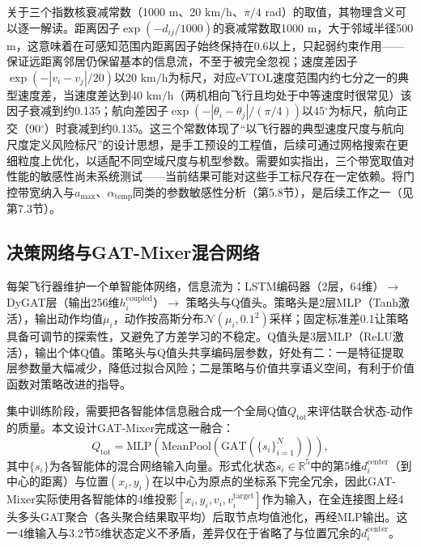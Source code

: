 \documentclass[12pt,a4paper,UTF8]{ctexart}
\begin{document}
关于三个指数核衰减常数（1000 m、20 $\mathrm{km/h}$、$\pi/4$ rad）的取值，其物理含义可以逐一解读。距离因子$\exp(-d_{ij}/1000)$的衰减常数取1000 m，大于邻域半径500 m，这意味着在可感知范围内距离因子始终保持在0.6以上，只起弱约束作用——保证远距离邻居仍保留基本的信息流，不至于被完全忽视；速度差因子$\exp(-|v_i-v_j|/20)$以20 $\mathrm{km/h}$为标尺，对应eVTOL速度范围内约七分之一的典型速度差，当速度差达到40 $\mathrm{km/h}$（两机相向飞行且均处于中等速度时很常见）该因子衰减到约0.135；航向差因子$\exp(-|\theta_i-\theta_j|/(\pi/4))$以45$^{\circ}$为标尺，航向正交（90$^{\circ}$）时衰减到约0.135。这三个常数体现了“以飞行器的典型速度尺度与航向尺度定义风险标尺”的设计思想，是手工预设的工程值，后续可通过网格搜索在更细粒度上优化，以适配不同空域尺度与机型参数。需要如实指出，三个带宽取值对性能的敏感性尚未系统测试——当前结果可能对这些手工标尺存在一定依赖。将门控带宽纳入与$a_{\max}$、$\alpha_{\text{temp}}$同类的参数敏感性分析（第5.8节），是后续工作之一（见第7.3节）。

\subsection{决策网络与GAT-Mixer混合网络}

每架飞行器维护一个单智能体网络，信息流为：LSTM编码器（2层，64维）$\to$ DyGAT层（输出256维$h_i^{\text{coupled}}$）$\to$ 策略头与Q值头。策略头是2层MLP（Tanh激活），输出动作均值$\mu_i$，动作按高斯分布$\mathcal{N}(\mu_i, 0.1^{2})$采样；固定标准差0.1让策略具备可调节的探索性，又避免了方差学习的不稳定。Q值头是3层MLP（ReLU激活），输出个体Q值。策略头与Q值头共享编码层参数，好处有二：一是特征提取层参数量大幅减少，降低过拟合风险；二是策略与价值共享语义空间，有利于价值函数对策略改进的指导。

集中训练阶段，需要把各智能体信息融合成一个全局Q值$Q_{\text{tot}}$来评估联合状态-动作的质量。本文设计GAT-Mixer完成这一融合：
\begin{equation}
    Q_{\text{tot}} = \text{MLP}\!\left(\text{MeanPool}\!\left(\text{GAT}\left(\{s_i\}_{i=1}^{N}\right)\right)\right),
    \label{eq:gat_mixer}
\end{equation}
其中$\{s_i\}$为各智能体的混合网络输入向量。形式化状态$s_i\in\mathbb{R}^5$中的第5维$d_i^{\text{center}}$（到中心的距离）与位置$(x_i,y_i)$在以中心为原点的坐标系下完全冗余，因此GAT-Mixer实际使用各智能体的4维投影$[x_i,y_i,v_i,v_i^{\text{target}}]$作为输入，在全连接图上经4头多头GAT聚合（各头聚合结果取平均）后取节点均值池化，再经MLP输出。这一4维输入与3.2节5维状态定义不矛盾，差异仅在于省略了与位置冗余的$d_i^{\text{center}}$。
\end{document}
